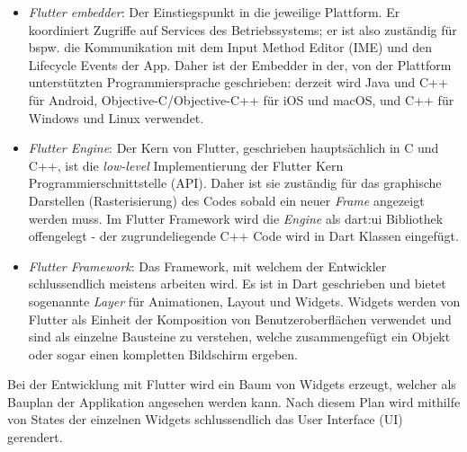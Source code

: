 \begin{itemize}
	\item \textit{Flutter embedder}: Der Einstiegspunkt in die jeweilige Plattform. Er koordiniert Zugriffe auf Services des Betriebssystems; er ist also zuständig für bspw. die Kommunikation mit dem Input Method Editor (IME) und den Lifecycle Events der App. Daher ist der Embedder in der, von der Plattform unterstützten Programmiersprache geschrieben: derzeit wird Java und C++ für Android, Objective-C/Objective-C++ für iOS und macOS, und C++ für Windows und Linux verwendet.
	\item \textit{Flutter Engine}: Der Kern von Flutter, geschrieben hauptsächlich in C und C++, ist die \textit{low-level} Implementierung der Flutter Kern Programmierschnittstelle (API). Daher ist sie zuständig für das graphische Darstellen (Rasterisierung) des Codes sobald ein neuer \textit{Frame} angezeigt werden muss. Im Flutter Framework wird die \textit{Engine} als dart:ui Bibliothek offengelegt - der zugrundeliegende C++ Code wird in Dart Klassen eingefügt. 
	\item \textit{Flutter Framework}: Das Framework, mit welchem der Entwickler schlussendlich meistens arbeiten wird. Es ist in Dart geschrieben und bietet sogenannte \textit{Layer} für Animationen, Layout und Widgets. Widgets werden von Flutter als Einheit der Komposition von Benutzeroberflächen verwendet und sind als einzelne Bausteine zu verstehen, welche zusammengefügt ein Objekt oder sogar einen kompletten Bildschirm ergeben.
\end{itemize}

Bei der Entwicklung mit Flutter wird ein Baum von Widgets erzeugt, welcher als Bauplan der Applikation angesehen werden kann. Nach diesem Plan wird mithilfe von States der einzelnen Widgets schlussendlich das User Interface (UI) gerendert.\cite{flutter2021}

